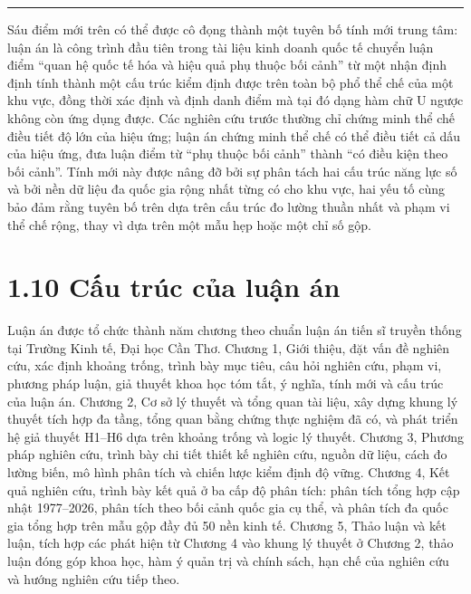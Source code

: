 \documentclass[
  a4paper,
  13pt]{extreport}
\begin{document}
\begin{center}\rule{0.5\linewidth}{0.5pt}\end{center}

Sáu điểm mới trên có thể được cô đọng thành một tuyên bố tính mới trung
tâm: luận án là công trình đầu tiên trong tài liệu kinh doanh quốc tế
chuyển luận điểm ``quan hệ quốc tế hóa và hiệu quả phụ thuộc bối cảnh''
từ một nhận định định tính thành một cấu trúc kiểm định được trên toàn
bộ phổ thể chế của một khu vực, đồng thời xác định và định danh điểm mà
tại đó dạng hàm chữ U ngược không còn ứng dụng được. Các nghiên cứu
trước thường chỉ chứng minh thể chế điều tiết độ lớn của hiệu ứng; luận
án chứng minh thể chế có thể điều tiết cả dấu của hiệu ứng, đưa luận
điểm từ ``phụ thuộc bối cảnh'' thành ``có điều kiện theo bối cảnh''.
Tính mới này được nâng đỡ bởi sự phân tách hai cấu trúc năng lực số và
bởi nền dữ liệu đa quốc gia rộng nhất từng có cho khu vực, hai yếu tố
cùng bảo đảm rằng tuyên bố trên dựa trên cấu trúc đo lường thuần nhất và
phạm vi thể chế rộng, thay vì dựa trên một mẫu hẹp hoặc một chỉ số gộp.

\hypertarget{cux1ea5u-truxfac-cux1ee7a-luux1eadn-uxe1n}{%
\section{1.10 Cấu trúc của luận
án}\label{cux1ea5u-truxfac-cux1ee7a-luux1eadn-uxe1n}}

Luận án được tổ chức thành năm chương theo chuẩn luận án tiến sĩ truyền
thống tại Trường Kinh tế, Đại học Cần Thơ. Chương 1, Giới thiệu, đặt vấn
đề nghiên cứu, xác định khoảng trống, trình bày mục tiêu, câu hỏi nghiên
cứu, phạm vi, phương pháp luận, giả thuyết khoa học tóm tắt, ý nghĩa,
tính mới và cấu trúc của luận án. Chương 2, Cơ sở lý thuyết và tổng quan
tài liệu, xây dựng khung lý thuyết tích hợp đa tầng, tổng quan bằng
chứng thực nghiệm đã có, và phát triển hệ giả thuyết H1--H6 dựa trên
khoảng trống và logic lý thuyết. Chương 3, Phương pháp nghiên cứu, trình
bày chi tiết thiết kế nghiên cứu, nguồn dữ liệu, cách đo lường biến, mô
hình phân tích và chiến lược kiểm định độ vững. Chương 4, Kết quả nghiên
cứu, trình bày kết quả ở ba cấp độ phân tích: phân tích tổng hợp cập
nhật 1977--2026, phân tích theo bối cảnh quốc gia cụ thể, và phân tích
đa quốc gia tổng hợp trên mẫu gộp đầy đủ 50 nền kinh tế. Chương 5, Thảo
luận và kết luận, tích hợp các phát hiện từ Chương 4 vào khung lý thuyết
ở Chương 2, thảo luận đóng góp khoa học, hàm ý quản trị và chính sách,
hạn chế của nghiên cứu và hướng nghiên cứu tiếp theo.
\end{document}
